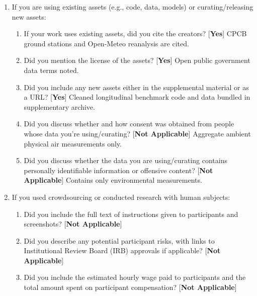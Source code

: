\documentclass[twoside]{article}
\theoremstyle{definition}
\renewcommand{\topfraction}{0.95}
\renewcommand{\bottomfraction}{0.95}
\renewcommand{\textfraction}{0.05}
\renewcommand{\floatpagefraction}{0.85}
\begin{document}
\begin{enumerate}
\item If you are using existing assets (e.g., code, data, models) or curating/releasing new assets:
\begin{enumerate}
  \item If your work uses existing assets, did you cite the creators? [\textbf{Yes}] CPCB ground stations and Open-Meteo reanalysis are cited.
  \item Did you mention the license of the assets? [\textbf{Yes}] Open public government data terms noted.
  \item Did you include any new assets either in the supplemental material or as a URL? [\textbf{Yes}] Cleaned longitudinal benchmark code and data bundled in supplementary archive.
  \item Did you discuss whether and how consent was obtained from people whose data you're using/curating? [\textbf{Not Applicable}] Aggregate ambient physical air measurements only.
  \item Did you discuss whether the data you are using/curating contains personally identifiable information or offensive content? [\textbf{Not Applicable}] Contains only environmental measurements.
\end{enumerate}

\item If you used crowdsourcing or conducted research with human subjects:
\begin{enumerate}
  \item Did you include the full text of instructions given to participants and screenshots? [\textbf{Not Applicable}]
  \item Did you describe any potential participant risks, with links to Institutional Review Board (IRB) approvals if applicable? [\textbf{Not Applicable}]
  \item Did you include the estimated hourly wage paid to participants and the total amount spent on participant compensation? [\textbf{Not Applicable}]
\end{enumerate}
\end{enumerate}

\clearpage
\onecolumn
\appendix
\allowdisplaybreaks
\setlength{\abovedisplayskip}{3pt plus 1pt minus 1pt}
\setlength{\belowdisplayskip}{3pt plus 1pt minus 1pt}
\setlength{\abovedisplayshortskip}{1.5pt plus 1pt minus 1pt}
\setlength{\belowdisplayshortskip}{1.5pt plus 1pt minus 1pt}
\setlength{\textfloatsep}{5pt plus 1pt minus 1pt}
\setlength{\floatsep}{4pt plus 1pt minus 1pt}
\setlength{\intextsep}{4pt plus 1pt minus 1pt}
\renewcommand{\topfraction}{0.95}
\renewcommand{\bottomfraction}{0.95}
\renewcommand{\textfraction}{0.05}
\renewcommand{\floatpagefraction}{0.85}
\setcounter{topnumber}{6}
\setcounter{bottomnumber}{6}
\setcounter{totalnumber}{8}
\end{document}
